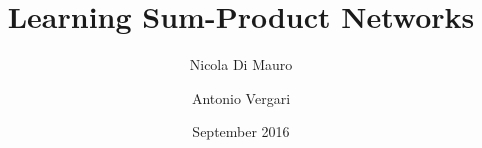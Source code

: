 \documentclass{beamer}
\title{Learning Sum-Product Networks}
\author{Nicola Di Mauro \and Antonio Vergari}
\date{September 2016}
\begin{document}
\begin{frame}
\maketitle
\end{frame}

\begin{frame}

\end{frame}
\end{document}
